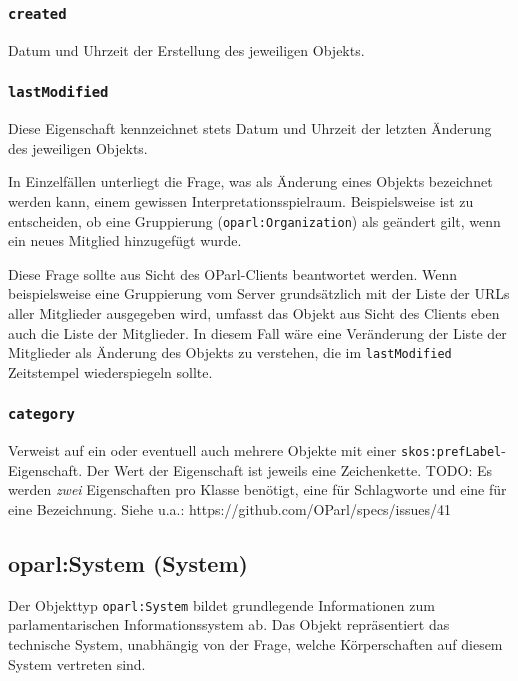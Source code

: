 \documentclass[,a4paper]{article}
\begin{document}
\subsubsection{\texttt{created}}\label{created}

Datum und Uhrzeit der Erstellung des jeweiligen Objekts.

\subsubsection{\texttt{lastModified}}\label{lastmodified}

Diese Eigenschaft kennzeichnet stets Datum und Uhrzeit der letzten
Änderung des jeweiligen Objekts.

In Einzelfällen unterliegt die Frage, was als Änderung eines Objekts
bezeichnet werden kann, einem gewissen Interpretationsspielraum.
Beispielsweise ist zu entscheiden, ob eine Gruppierung
(\texttt{oparl:Organization}) als geändert gilt, wenn ein neues Mitglied
hinzugefügt wurde.

Diese Frage sollte aus Sicht des OParl-Clients beantwortet werden. Wenn
beispielsweise eine Gruppierung vom Server grundsätzlich mit der Liste
der URLs aller Mitglieder ausgegeben wird, umfasst das Objekt aus Sicht
des Clients eben auch die Liste der Mitglieder. In diesem Fall wäre eine
Veränderung der Liste der Mitglieder als Änderung des Objekts zu
verstehen, die im \texttt{lastModified} Zeitstempel wiederspiegeln
sollte.

\subsubsection{\texttt{category}}\label{category}

Verweist auf ein oder eventuell auch mehrere Objekte mit einer
\texttt{skos:prefLabel}-Eigenschaft. Der Wert der Eigenschaft ist
jeweils eine Zeichenkette. TODO: Es werden \emph{zwei} Eigenschaften pro
Klasse benötigt, eine für Schlagworte und eine für eine Bezeichnung.
Siehe u.a.: https://github.com/OParl/specs/issues/41

\subsection{oparl:System (System)}\label{oparlux5fsystem}

Der Objekttyp \texttt{oparl:System} bildet grundlegende Informationen
zum parlamentarischen Informationssystem ab. Das Objekt repräsentiert
das technische System, unabhängig von der Frage, welche Körperschaften
auf diesem System vertreten sind.
\end{document}
